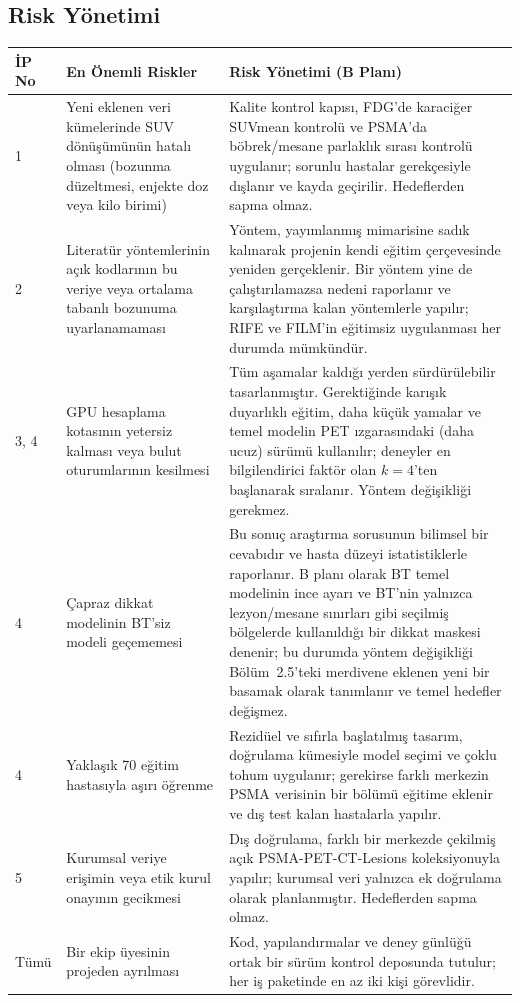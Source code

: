 \documentclass[11pt,a4paper]{article}
\begin{document}
\subsection{Risk Yönetimi}

{\small
\begin{longtable}{@{}L{1.0cm}L{5.0cm}L{8.0cm}@{}}
\toprule
İP No & En Önemli Riskler & Risk Yönetimi (B Planı) \\
\midrule
{} & Yeni eklenen veri kümelerinde SUV dönüşümünün hatalı olması (bozunma düzeltmesi, enjekte doz
  veya kilo birimi)
  & Kalite kontrol kapısı, FDG'de karaciğer SUVmean kontrolü ve PSMA'da böbrek/mesane parlaklık
  sırası kontrolü uygulanır; sorunlu hastalar gerekçesiyle dışlanır ve kayda geçirilir.
  Hedeflerden sapma olmaz. \\
2 & Literatür yöntemlerinin açık kodlarının bu veriye veya ortalama tabanlı bozunuma
  uyarlanamaması
  & Yöntem, yayımlanmış mimarisine sadık kalınarak projenin kendi eğitim çerçevesinde yeniden
  gerçeklenir. Bir yöntem yine de çalıştırılamazsa nedeni raporlanır ve karşılaştırma kalan
  yöntemlerle yapılır; RIFE ve FILM'in eğitimsiz uygulanması her durumda mümkündür. \\
3, 4 & GPU hesaplama kotasının yetersiz kalması veya bulut oturumlarının kesilmesi
  & Tüm aşamalar kaldığı yerden sürdürülebilir tasarlanmıştır. Gerektiğinde karışık duyarlıklı
  eğitim, daha küçük yamalar ve temel modelin PET ızgarasındaki (daha ucuz) sürümü kullanılır;
  deneyler en bilgilendirici faktör olan $k = 4$'ten başlanarak sıralanır. Yöntem değişikliği
  gerekmez. \\
4 & Çapraz dikkat modelinin BT'siz modeli geçememesi
  & Bu sonuç araştırma sorusunun bilimsel bir cevabıdır ve hasta düzeyi istatistiklerle
  raporlanır. B planı olarak BT temel modelinin ince ayarı ve BT'nin yalnızca lezyon/mesane
  sınırları gibi seçilmiş bölgelerde kullanıldığı bir dikkat maskesi denenir; bu durumda yöntem
  değişikliği Bölüm~2.5'teki merdivene eklenen yeni bir basamak olarak tanımlanır ve temel
  hedefler değişmez. \\
4 & Yaklaşık 70 eğitim hastasıyla aşırı öğrenme
  & Rezidüel ve sıfırla başlatılmış tasarım, doğrulama kümesiyle model seçimi ve çoklu tohum
  uygulanır; gerekirse farklı merkezin PSMA verisinin bir bölümü eğitime eklenir ve dış test
  kalan hastalarla yapılır. \\
5 & Kurumsal veriye erişimin veya etik kurul onayının gecikmesi
  & Dış doğrulama, farklı bir merkezde çekilmiş açık PSMA-PET-CT-Lesions koleksiyonuyla yapılır;
  kurumsal veri yalnızca ek doğrulama olarak planlanmıştır. Hedeflerden sapma olmaz. \\
Tümü & Bir ekip üyesinin projeden ayrılması
  & Kod, yapılandırmalar ve deney günlüğü ortak bir sürüm kontrol deposunda tutulur; her iş
  paketinde en az iki kişi görevlidir. \\
\bottomrule
\end{longtable}
}
\end{document}
